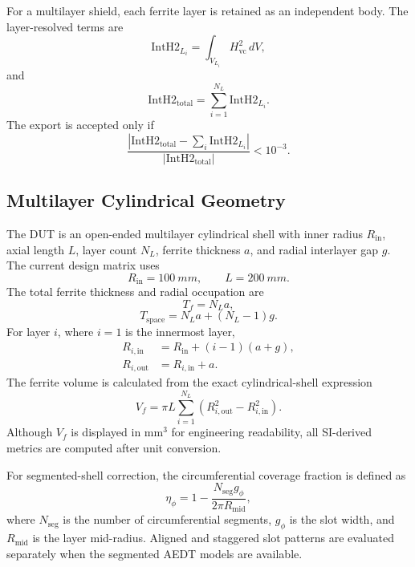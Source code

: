 ﻿\documentclass[letterpaper,journal]{IEEEtran}
\begin{document}
For a multilayer shield, each ferrite layer is retained as an independent body. The layer-resolved terms are
\begin{equation}
\mathrm{IntH2}_{L_i}=\int_{V_{L_i}}H_{\mathrm{vc}}^2\,dV,
\label{eq:inth2layer}
\end{equation}
and
\begin{equation}
\mathrm{IntH2}_{\mathrm{total}}=\sum_{i=1}^{N_L}\mathrm{IntH2}_{L_i}.
\label{eq:inth2total}
\end{equation}
The export is accepted only if
\begin{equation}
\frac{|\mathrm{IntH2}_{\mathrm{total}}-\sum_i\mathrm{IntH2}_{L_i}|}
{|\mathrm{IntH2}_{\mathrm{total}}|}<10^{-3}.
\label{eq:inth2check}
\end{equation}

\subsection{Multilayer Cylindrical Geometry}

The DUT is an open-ended multilayer cylindrical shell with inner radius $R_{\mathrm{in}}$, axial length $L$, layer count $N_L$, ferrite thickness $a$, and radial interlayer gap $g$. The current design matrix uses
\begin{equation}
R_{\mathrm{in}}=\SI{100}{mm},\qquad L=\SI{200}{mm}.
\label{eq:basicgeometry}
\end{equation}
The total ferrite thickness and radial occupation are
\begin{equation}
T_f=N_La,
\label{eq:tf}
\end{equation}
\begin{equation}
T_{\mathrm{space}}=N_La+(N_L-1)g.
\label{eq:tspace}
\end{equation}
For layer $i$, where $i=1$ is the innermost layer,
\begin{align}
R_{i,\mathrm{in}} &= R_{\mathrm{in}}+(i-1)(a+g),\\
R_{i,\mathrm{out}} &= R_{i,\mathrm{in}}+a.
\end{align}
The ferrite volume is calculated from the exact cylindrical-shell expression
\begin{equation}
V_f=\pi L\sum_{i=1}^{N_L}\left(R_{i,\mathrm{out}}^2-R_{i,\mathrm{in}}^2\right).
\label{eq:vf}
\end{equation}
Although $V_f$ is displayed in $\mathrm{mm^3}$ for engineering readability, all SI-derived metrics are computed after unit conversion.

For segmented-shell correction, the circumferential coverage fraction is defined as
\begin{equation}
\eta_\phi=1-\frac{N_{\mathrm{seg}}g_\phi}{2\pi R_{\mathrm{mid}}},
\label{eq:etaphi}
\end{equation}
where $N_{\mathrm{seg}}$ is the number of circumferential segments, $g_\phi$ is the slot width, and $R_{\mathrm{mid}}$ is the layer mid-radius. Aligned and staggered slot patterns are evaluated separately when the segmented AEDT models are available.
\end{document}
